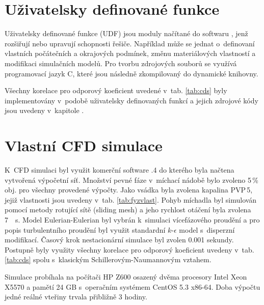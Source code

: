 \vspace{-12mm}

\section{Uživatelsky definované funkce}
Uživatelsky definované funkce (UDF) jsou moduly načítané do softwaru \flu, jenž rozšiřují nebo upravují schopnosti řešiče. Například může se jednat o~definovaní vlastních počátečních a okrajových podmínek, změnu materiálových vlastností a modifikaci simulačních modelů. Pro tvorbu zdrojových souborů se využívá programovací jazyk C, které jsou následně zkompilovaný do dynamické knihovny.

Všechny korelace pro odporový koeficient uvedené v~tab. \ref{tab:cds} byly implementovány v~podobě uživatelsky definovaných funkcí a jejich zdrojové kódy jsou uvedeny v~kapitole .

\section{Vlastní CFD simulace}
K~CFD simulaci byl využit komerční software .4 do kterého byla načtena vytvořená výpočetní síť. Množství pevné fáze v~míchací nádobě bylo zvoleno 5\,\%\,obj. pro všechny provedené výpočty. Jako vsádka byla zvolena kapalina PVP\,5, jejiž vlastnosti jsou uvedeny v~tab. \ref{tab:fyzvlast}. Pohyb míchadla byl simulován pomocí metody rotující sítě (sliding mesh) a jeho rychlost otáčení byla zvolena \SI{7}{\per\second}. Model Eulerian-Eulerian byl vybrán k~simulaci vícefázového proudění a pro popis turbulentního proudění byl využit standardní $k\mbox{-}\epsilon$ model s~disperzní modifikací. Časový krok nestacionární simulace byl zvolen \num{0.001} sekundy. Postupně byly využity všechny korelace pro odporový koeficient uvedeny v~tab. \ref{tab:cds} spolu s~klasickým Schillerovým-Naumannovým vztahem. 

Simulace probíhala na počítači HP Z600 osazený dvěma procesory Intel Xeon X5570 a pamětí 24 GB s~operačním systémem CentOS 5.3 x86-64. Doba výpočtu jedné reálné vteřiny trvala přibližně 3 hodiny.



